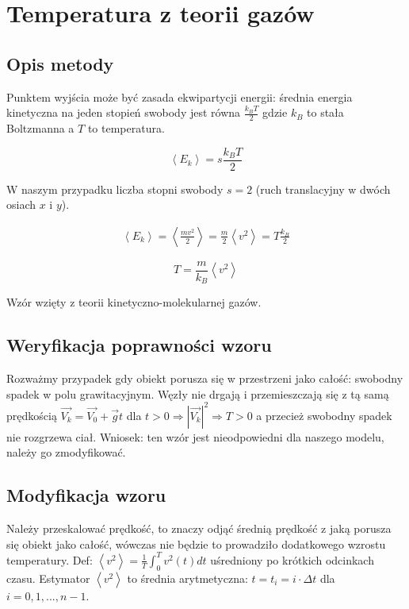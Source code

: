 \documentclass[12pt, letterpaper]{report}
\begin{document}
    \section{Temperatura z teorii gazów}
    \subsection{Opis metody}
    Punktem wyjścia może być zasada ekwipartycji energii: średnia energia kinetyczna na jeden stopień swobody jest równa 
    $\frac{k_{B}T}{2}$ gdzie $k_{B}$ to stała Boltzmanna a $T$ to temperatura.

    \begin{equation}
        \left< E_{k} \right> = s \frac{k_{B}T}{2}
    \end{equation}

    W naszym przypadku liczba stopni swobody $s = 2$ (ruch translacyjny w dwóch osiach $x$ i $y$).

    \begin{align*}
        \left< E_{k} \right> = \left< \frac{m v^{2}}{2} \right> = \frac{m}{2} \left< v^{2} \right> = T \frac{k_{B}}{2}
    \end{align*}

    \begin{equation}
        T = \frac{m}{k_{B}} \left< v^{2} \right>
    \end{equation}

    Wzór wzięty z teorii kinetyczno-molekularnej gazów.

    \subsection{Weryfikacja poprawności wzoru}
    Rozważmy przypadek gdy obiekt porusza się w przestrzeni jako całość: swobodny spadek w polu grawitacyjnym.
    Węzły nie drgają i przemieszczają się z tą samą prędkością 
    $\vec{V_k} = \vec{V_0} + \vec{g}t$ dla $t > 0  \Rightarrow  |\vec{V_k}|^2  \Rightarrow  T > 0$ a 
    przecież swobodny spadek nie rozgrzewa ciał. 
    Wniosek: ten wzór jest nieodpowiedni dla naszego modelu, należy go zmodyfikować.
    
    \subsection{Modyfikacja wzoru}
    Należy przeskalować prędkość, to znaczy odjąć średnią prędkość z jaką porusza się obiekt jako całość, wówczas nie będzie
    to prowadziło dodatkowego wzrostu temperatury. Def: $\left< v^{2} \right>  =  \frac{1}{T} \int_{0}^{T} v^2(t) dt$
    uśredniony po krótkich odcinkach czasu. Estymator $\left< v^{2} \right>$ to średnia arytmetyczna: 
    $t = t_i = i \cdot \Delta t$ dla $i = 0, 1, ..., n-1$.
\end{document}
